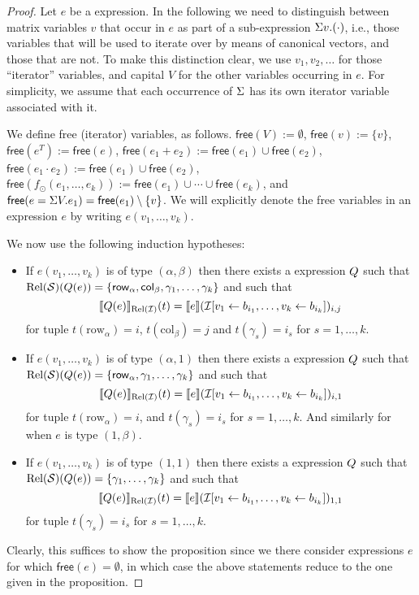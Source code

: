 \begin{proof}
Let $e$ be a \langsum expression. In the following we need to distinguish between matrix variables $v$
that occur in $e$ as part of a sub-expression $\Sigma v. (\cdot)$, i.e., those variables that will be used to iterate over by means of canonical vectors, and those that are not. To make this distinction clear, we use $v_1,v_2,\ldots$ for those ``iterator'' variables, and capital $V$ for the other variables occurring in $e$. For simplicity, we assume that each occurrence of $\Sigma$ has its own iterator variable associated with it. 

We define free (iterator) variables, as follows.
$\mathsf{free}(V):=\emptyset$, $\mathsf{free}(v):=\{v\}$, $\mathsf{free}(e^T):=\mathsf{free}(e)$, $\mathsf{free}(e_1+e_2):=\mathsf{free}(e_1)\cup \mathsf{free}(e_2)$, $\mathsf{free}(e_1\cdot e_2):=\mathsf{free}(e_1)\cup \mathsf{free}(e_2)$,
 $\mathsf{free}(f_\odot(e_1,\ldots,e_k)):=\mathsf{free}(e_1)\cup\cdots \cup \mathsf{free}(e_k)$, and $\mathsf{free}(e=\Sigma V. e_1)=\mathsf{free}(e_1)\setminus\{v\}$. We will explicitly denote the free variables in an expression $e$ by writing $e(v_1,\ldots,v_k)$.

We now use the following induction hypotheses:
\begin{itemize}
	\item If $e(v_1,\ldots,v_k)$ is of type $(\alpha,\beta)$ then there exists a
	\rak expression $Q$ such that $\text{Rel}(\mathcal{S})(Q(e))=\{\mathsf{row}_\alpha,\mathsf{col}_\beta,\gamma_1,\ldots,\gamma_k\}$
	and such that 
	$$
	\llbracket Q(e) \rrbracket_{\text{Rel}(\mathcal{I})}(t)=\llbracket e \rrbracket(\mathcal{I}[v_1\gets b_{i_1},\ldots,v_k\gets b_{i_k}])_{i,j}
	$$
	for tuple $t(\mathrm{row}_\alpha)=i$, $t(\mathrm{col}_\beta)=j$ and $t(\gamma_s)=i_s$ for $s=1,\ldots, k$.
	\item If $e(v_1,\ldots,v_k)$ is of type $(\alpha,1)$ then there exists a
	\rak expression $Q$ such that $\text{Rel}(\mathcal{S})(Q(e))=\{\mathsf{row}_\alpha,\gamma_1,\ldots,\gamma_k\}$
	and such that 
	$$
	\llbracket Q(e) \rrbracket_{\text{Rel}(\mathcal{I})}(t)=\llbracket e \rrbracket(\mathcal{I}[v_1\gets b_{i_1},\ldots,v_k\gets b_{i_k}])_{i,1}
	$$
	for tuple $t(\mathrm{row}_\alpha)=i$,  and $t(\gamma_s)=i_s$ for $s=1,\ldots, k$.
	And similarly for when $e$ is type $(1,\beta)$.
	\item If $e(v_1,\ldots,v_k)$ is of type $(1,1)$ then there exists a
	\rak expression $Q$ such that $\text{Rel}(\mathcal{S})(Q(e))=\{\gamma_1,\ldots,\gamma_k\}$
	and such that 
	$$
	\llbracket Q(e) \rrbracket_{\text{Rel}(\mathcal{I})}(t)=\llbracket e \rrbracket(\mathcal{I}[v_1\gets b_{i_1},\ldots,v_k\gets b_{i_k}])_{1,1}
	$$
	for tuple $t(\gamma_s)=i_s$ for $s=1,\ldots, k$.
\end{itemize}
Clearly, this suffices to show the proposition since we there consider expressions $e$ for which $\mathsf{free}(e)=\emptyset$, in which case the above statements reduce to the one given in the proposition.



\end{proof}
